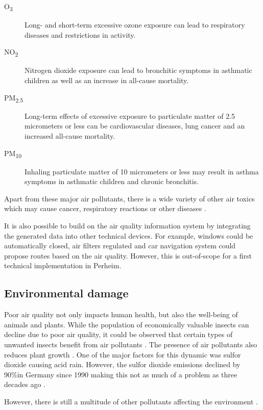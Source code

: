\documentclass[conference]{IEEEtran}
\begin{document}
\begin{description} 
\item[O\textsubscript{3}] Long- and short-term excessive ozone exposure can lead to respiratory diseases and restrictions in activity.
\item[NO\textsubscript{2}] Nitrogen dioxide exposure can lead to bronchitic symptoms in asthmatic children as well as an increase in all-cause mortality.
\item[PM\textsubscript{2.5}] Long-term effects of excessive exposure to particulate matter of 2.5 micrometers or less can be cardiovascular diseases, lung cancer and an increased all-cause mortality.
\item[PM\textsubscript{10}] Inhaling particulate matter of 10 micrometers or less may result in asthma symptoms in asthmatic children and chronic bronchitis.
\end{description} 

Apart from these major air pollutants, there is a wide variety of other air toxics which may cause cancer, respiratory reactions or other diseases \cite{UnitedStatesEnvironmentalProtectionAgency}.

It is also possible to  build on the air quality information system by integrating the generated data into other technical devices. For example, windows could be automatically closed, air filters regulated and car navigation system could propose routes based on the air quality. However, this is out-of-scope for a first technical implementation in Perheim.

\subsection{Environmental damage}
Poor air quality not only impacts human health, but also the well-being of animals and plants. While the population of economically valuable insects can decline due to poor air quality, it could be observed that certain types of unwanted insects benefit from air pollutants \cite{Dohmen.1984}\cite{Alstad.1982}. The presence of air pollutants also reduces plant growth \cite{CRITTENDEN.1978}. One of the major factors for this dynamic was sulfor dioxide causing acid rain. However, the sulfor dioxide emissions declined by 90\%in Germany since 1990 making this not as much of a problem as three decades ago \cite{Umweltbundesamt.01.05.2019}.

However, there is still a multitude of other pollutants affecting the environment \cite{Umweltbundesamt.2018}\cite{UnitedStatesEnvironmentalProtectionAgency.01.05.2019}.
\end{document}
